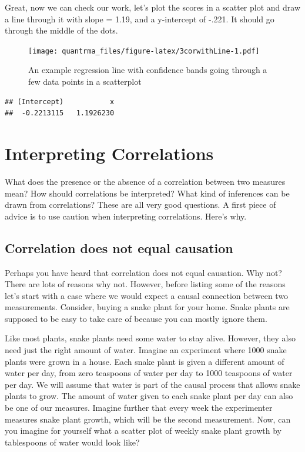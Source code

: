 \documentclass[
]{book}
\begin{document}
Great, now we can check our work, let's plot the scores in a scatter plot and draw a line through it with slope = 1.19, and a y-intercept of -.221. It should go through the middle of the dots.

\begin{figure}
\centering
\texttt{[image: quantrma\_files/figure-latex/3corwithLine-1.pdf]}
\caption{\label{fig:3corwithLine}An example regression line with confidence bands going through a few data points in a scatterplot}
\end{figure}

\begin{verbatim}
## (Intercept)           x 
##  -0.2213115   1.1926230
\end{verbatim}

\hypertarget{interpreting-correlations}{%
\section{Interpreting Correlations}\label{interpreting-correlations}}

What does the presence or the absence of a correlation between two measures mean? How should correlations be interpreted? What kind of inferences can be drawn from correlations? These are all very good questions. A first piece of advice is to use caution when interpreting correlations. Here's why.

\hypertarget{correlation-does-not-equal-causation}{%
\subsection{Correlation does not equal causation}\label{correlation-does-not-equal-causation}}

Perhaps you have heard that correlation does not equal causation. Why not? There are lots of reasons why not. However, before listing some of the reasons let's start with a case where we would expect a causal connection between two measurements. Consider, buying a snake plant for your home. Snake plants are supposed to be easy to take care of because you can mostly ignore them.

Like most plants, snake plants need some water to stay alive. However, they also need just the right amount of water. Imagine an experiment where 1000 snake plants were grown in a house. Each snake plant is given a different amount of water per day, from zero teaspoons of water per day to 1000 teaspoons of water per day. We will assume that water is part of the causal process that allows snake plants to grow. The amount of water given to each snake plant per day can also be one of our measures. Imagine further that every week the experimenter measures snake plant growth, which will be the second measurement. Now, can you imagine for yourself what a scatter plot of weekly snake plant growth by tablespoons of water would look like?
\end{document}
